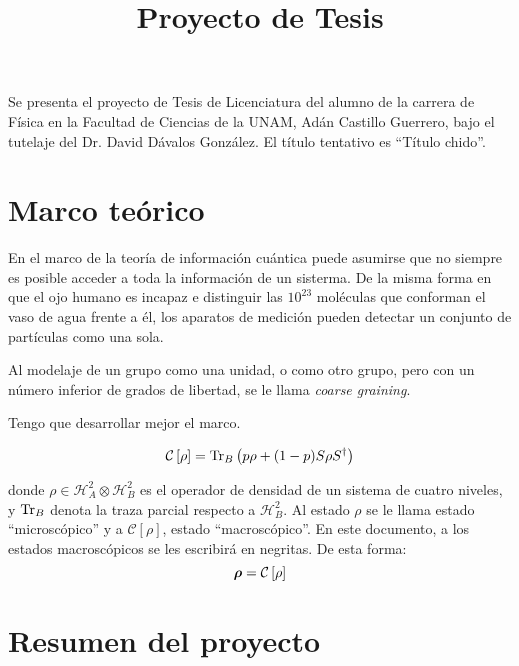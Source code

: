 \documentclass[onecolumn,11pt]{article}
\title{Proyecto de Tesis} \date{}
\newcommand{\Cc}{\mathcal{C}} %
\newcommand{\Hh}{\mathcal{H}} %
\newcommand{\CG}[1]{\Cc\left[#1\right]}
\newcommand*{\B}[1]{\ifmmode\bm{#1}\else\textbf{#1}\fi}
\begin{document}
\maketitle
\thispagestyle{empty}
Se presenta el proyecto de Tesis de Licenciatura del alumno de la carrera de Física en la Facultad de Ciencias de la UNAM, Adán Castillo Guerrero, bajo el tutelaje del Dr. David Dávalos González. El título tentativo es ``Título chido''.

\section{Marco teórico}

En el marco de la teoría de información cuántica puede asumirse que no siempre es posible acceder a toda la información de un sisterma. De la misma forma en que el ojo humano es incapaz e distinguir las $10^{23}$ moléculas que conforman el vaso de agua frente a él, los aparatos de medición pueden detectar un conjunto de partículas como una sola. 

Al modelaje de un grupo como una unidad, o como otro grupo, pero con un número inferior de grados de libertad, se le llama \textit{coarse graining}. 

Tengo que desarrollar mejor el marco.

\begin{equation}\label{eq:CG}
    \Cc\left[\rho\right]=\Tr_{B}\left(p\rho+(1-p)S\rho S^{\dag}\right)
\end{equation}

donde $\rho\in \Hh^{2}_{A}\otimes \Hh^{2}_{B}$ es el operador de densidad de un sistema de cuatro niveles, y $\Tr_{B}$ denota la traza parcial respecto a $\Hh^{2}_{B}$. Al estado $\rho$ se le llama estado ``microscópico'' y a $\CG{\rho}$, estado ``macroscópico''. En este documento, a los estados macroscópicos se les escribirá en negritas. De esta forma:
\begin{equation}
    \B{\rho}=\CG{\rho}
\end{equation}

\vspace{0.5cm}
\section{Resumen del proyecto}
\end{document}
